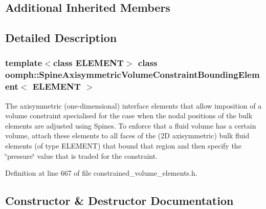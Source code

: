 \subsection*{Additional Inherited Members}


\subsection{Detailed Description}
\subsubsection*{template$<$class E\+L\+E\+M\+E\+NT$>$\newline
class oomph\+::\+Spine\+Axisymmetric\+Volume\+Constraint\+Bounding\+Element$<$ E\+L\+E\+M\+E\+N\+T $>$}

The axisymmetric (one-\/dimensional) interface elements that allow imposition of a volume constraint specialised for the case when the nodal positions of the bulk elements are adjusted using Spines. To enforce that a fluid volume has a certain volume, attach these elements to all faces of the (2D axisymmetric) bulk fluid elements (of type E\+L\+E\+M\+E\+NT) that bound that region and then specify the \char`\"{}pressure\char`\"{} value that is traded for the constraint. 

Definition at line 667 of file constrained\+\_\+volume\+\_\+elements.\+h.



\subsection{Constructor \& Destructor Documentation}
\mbox{\label{classoomph_1_1SpineAxisymmetricVolumeConstraintBoundingElement_a5b9c09e04e27442d00950c9bf513657e}} 
